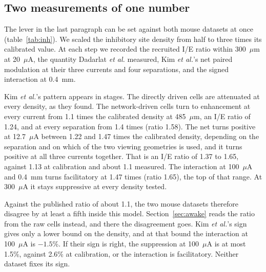 \documentclass[10pt,twocolumn]{article}
\newcommand{\um}{\ensuremath{\mu\text{m}}}
\newcommand{\uA}{\ensuremath{\mu\text{A}}}
\begin{document}
\begin{table}[t]
\centering
\caption{Headline numbers across the parameters the literature leaves
  open. Site densities are relative to the calibrated values. Signed
  interaction is summed over the sheet, and peak is the largest
  single-point departure, both in percent of the sum of single responses.
  The last two columns give the output of a $4\times4$ array at
  400~\um{} pitch relative to the sum of its electrodes driven alone.
  $^\dagger$A secondary rise between 1.6 and 2.4~mm, at about a sixth of
  the main peak.}
\label{tab:t4}
\small

\end{table}

\subsection{Two measurements of one number}
\label{sec:twoconstraints}

The lever in the last paragraph can be set against both mouse datasets at
once (table~\ref{tab:inh}). We scaled the inhibitory site density from half
to three times its calibrated value. At each step we recorded the
recruited I/E ratio within 300~\um{} at 20~\uA, the quantity Dadarlat
\textit{et al.} measured, Kim \textit{et al.}'s net paired modulation at
their three currents and four separations, and the signed interaction at
0.4~mm.

Kim \textit{et al.}'s pattern appears in stages. The directly driven cells
are attenuated at every density, as they found. The network-driven cells
turn to enhancement at every current from 1.1 times the calibrated
density at 485~\um, an I/E ratio of 1.24, and at every separation from
1.4 times (ratio 1.58). The net turns positive at 12.7~\uA{} between
1.22 and 1.47 times the calibrated density, depending on the separation
and on which of the two viewing geometries is used, and it turns positive
at all three currents together. That is an I/E ratio of 1.37 to 1.65,
against 1.13 at calibration and about 1.1 measured. The interaction at
100~\uA{} and 0.4~mm turns facilitatory at 1.47 times (ratio 1.65), the
top of that range. At 300~\uA{} it stays suppressive at every density
tested.

Against the published ratio of about 1.1, the two mouse datasets therefore
disagree by at least a fifth inside this model. Section~\ref{sec:awake}
reads the ratio from the raw cells instead, and there the disagreement
goes. Kim \textit{et al.}'s sign gives only a lower bound
on the density, and at that bound the interaction at 100~\uA{} is
$-1.5$\%. If their sign is right, the suppression at 100~\uA{} is at most
1.5\%, against 2.6\% at calibration, or the interaction is facilitatory.
Neither dataset fixes its sign.
\end{document}
